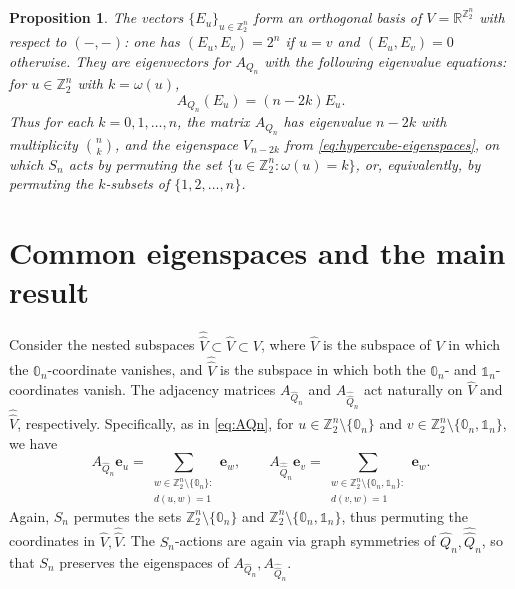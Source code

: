 \documentclass[10pt]{amsart}
\theoremstyle{plain}
\newtheorem{proposition}[conjecture]{Proposition}
\newcommand{\zero}{\mathbb{0}}
\newcommand{\one}{\mathbb{1}}
\newcommand{\ee}{\mathbf{e}}
\newcommand{\ZZ}{\mathbb{Z}}
\newcommand{\RR}{\mathbb{R}}
\begin{document}
\begin{proposition}
\label{prop:eigenspaces-for-hypercube}
The vectors \(\{E_u\}_{u \in \ZZ_2^n}\) form an orthogonal basis of
\(V=\RR^{\ZZ_2^n}\) with respect to $(-,-)$:
one has $(E_u,E_v) = 2^n$ if $u=v$ and $(E_u,E_v) =0$ otherwise.
They are eigenvectors for \(A_{Q_n}\) with the following eigenvalue
equations: for \( u\in \ZZ_2^n \) with \( k=\omega(u) \),
\begin{equation}
\label{eqn:eigenvector-equation-for-Eu}
A_{Q_n}(E_u)=(n-2k) E_u.
\end{equation}
Thus for each \(k=0,1,\ldots,n\), the matrix
\(A_{Q_n}\) has eigenvalue \(n-2k\) with
multiplicity \(\binom{n}{k}\), and the
eigenspace \(V_{n-2k}\) 
from \eqref{eq:hypercube-eigenspaces},
on which \(S_n\) acts by permuting the set
\(\{u \in \ZZ_2^n:\omega(u)=k\}\),
or, equivalently, by permuting the \(k\)-subsets of \(\{1,2,\ldots,n\}\).
\end{proposition}


\section{Common eigenspaces and the main result}
\label{sec:common-eigensapces}



Consider the nested subspaces
\(\hat{\hat{V}} \subset \hat{V} \subset V\), where \(\hat{V}\) is the
subspace of \(V\) in which the \(\zero_n\)-coordinate vanishes, and
\(\hat{\hat{V}}\) is the subspace in which both the \(\zero_n\)- and
\(\one_n\)-coordinates vanish. The adjacency matrices
\(A_{\hat{Q}_n}\) and \(A_{\hat{\hat{Q}}_n}\) act naturally on
\(\hat{V}\) and \(\hat{\hat{V}}\), respectively. Specifically, as in
\eqref{eq:AQn}, for
\( u\in \ZZ_2^n \setminus \{\zero_n\} \) and
\( v\in \ZZ_2^n \setminus \{\zero_n, \one_n\} \), we have
\[
  A_{\hat{Q}_n} \ee_u = \sum_{\substack{w \in \ZZ_2^n \setminus \{\zero_n\}:\\ d(u,w)=1}} \ee_w, \qquad
  A_{\hat{\hat{Q}}_n} \ee_v = \sum_{\substack{w \in \ZZ_2^n \setminus \{\zero_n,\one_n\}:\\ d(v,w)=1}} \ee_w.
\]
Again, $S_n$ permutes the sets $\ZZ_2^n\setminus \{\zero_n\}$ and $\ZZ_2^n\setminus \{\zero_n,\one_n\}$, 
thus permuting the coordinates in $\hat{V}, \hat{\hat{V}}$.
The $S_n$-actions
are again via graph symmetries of $\hat{Q}_n, \hat{\hat{Q}}_n$, so that $S_n$ preserves
the eigenspaces of $A_{\hat{Q}_n}, A_{\hat{\hat{Q}}_n}$.
\end{document}
